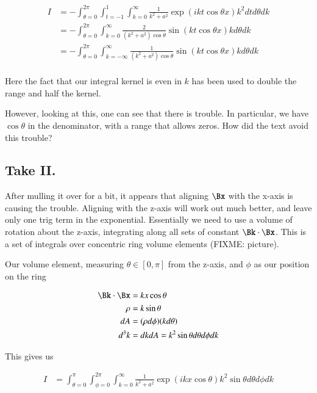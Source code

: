\begin{align*}
I
&= -\int_{\theta=0}^{2\pi} \int_{t=-1}^{1} \int_{k=0}^\infty \frac{1}{k^2 + a^2} \exp\left( i k t \cos\theta x \right) k^2 dt d\theta dk \\
&= -\int_{\theta=0}^{2\pi} \int_{k=0}^\infty \frac{2}{(k^2 + a^2) \cos\theta} \sin\left( k t \cos\theta x \right) k d\theta dk \\
&= -\int_{\theta=0}^{2\pi} \int_{k=-\infty}^\infty \frac{1}{(k^2 + a^2) \cos\theta} \sin\left( k t \cos\theta x \right) k d\theta dk \\
\end{align*}

Here the fact that our integral kernel is even in $k$ has been used to double the range and half the kernel.

However, looking at this, one can see that there is trouble.  In particular, we have $\cos\theta$ in the denominator, with a range that allows zeros.  How did the text avoid this trouble?

\subsection{Take II. }

After mulling it over for a bit, it appears that aligning $\Bx$ with the x-axis is causing the trouble.  Aligning
with the
z-axis will work out much better, and leave only one trig term in the exponential.  Essentially we need to
use a volume of rotation about the z-axis, integrating along all sets of constant $\Bk \cdot \Bx$.
This is a set of integrals over concentric ring volume elements (FIXME: picture).

Our volume element, measuring $\theta \in [0, \pi]$ from the z-axis, and $\phi$ as our position on the ring

\begin{align*}
\Bk \cdot \Bx &= k x \cos\theta \\
\rho &= k \sin\theta \\
dA &= (\rho d\phi)(k d\theta) \\
d^3 k &= dk dA = k^2 \sin\theta d\theta d\phi dk \\
\end{align*}

This gives us

\begin{align*}
I &= \int_{\theta=0}^{\pi} \int_{\phi=0}^{2\pi} \int_{k=0}^\infty \frac{1}{k^2 + a^2} \exp\left( i k x \cos\theta \right)
k^2 \sin\theta d\theta d\phi dk \\
\end{align*}

